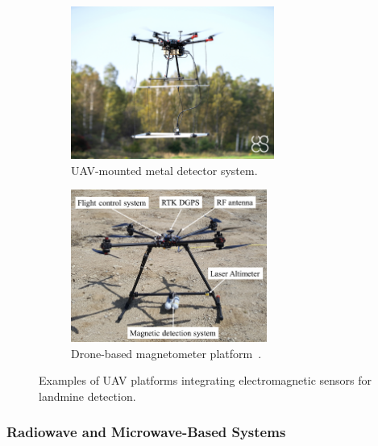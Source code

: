 \begin{figure}[h!]
    \centering
    \begin{subfigure}[b]{0.48\linewidth}
        \centering
        \includegraphics[height=5cm]{figs/Huirui/metal_detector_drone.png}
        \caption{\gls{UAV}-mounted metal detector system\protect\footnotemark.}
        \label{fig:metal_detector_drone}
    \end{subfigure}
    \hfill
    \begin{subfigure}[b]{0.48\linewidth}
        \centering
        \includegraphics[height=5cm]{figs/Huirui/magnetometer_drone.png}
        \caption{Drone-based magnetometer platform~\cite{yoo2020drone}.}
        \label{fig:magnetometer_drone}
    \end{subfigure}
    \caption{Examples of \gls{UAV} platforms integrating electromagnetic sensors for landmine detection.}
    \label{fig:emi_uav_examples}
\end{figure}




\subsubsection{Radiowave and Microwave-Based Systems}\label{Radiowave}

